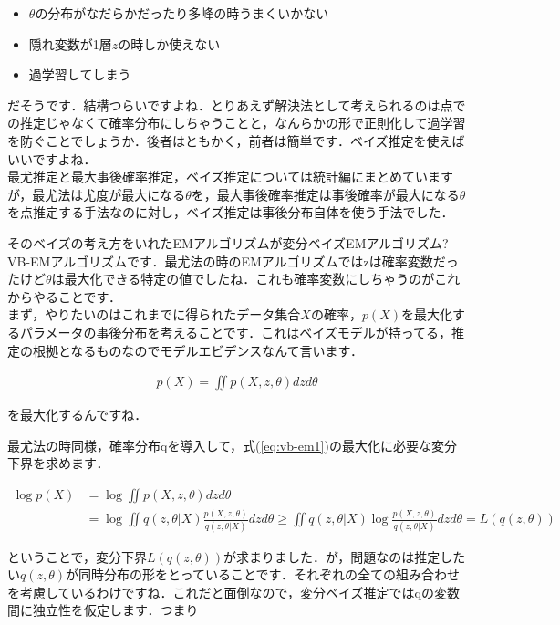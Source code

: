\documentclass[11pt,a4paper,dvipdfmx]{ujreport}
\begin{document}
\begin{itemize}
  \item $\theta$の分布がなだらかだったり多峰の時うまくいかない
  \item 隠れ変数が1層$z$の時しか使えない
  \item 過学習してしまう
\end{itemize}

だそうです．結構つらいですよね．とりあえず解決法として考えられるのは点での推定じゃなくて確率分布にしちゃうことと，なんらかの形で正則化して過学習を防ぐことでしょうか．後者はともかく，前者は簡単です．ベイズ推定を使えばいいですよね．\\

最尤推定と最大事後確率推定，ベイズ推定については統計編にまとめていますが，最尤法は尤度が最大になる$\theta$を，最大事後確率推定は事後確率が最大になる$\theta$を点推定する手法なのに対し，ベイズ推定は事後分布自体を使う手法でした．

そのベイズの考え方をいれたEMアルゴリズムが変分ベイズEMアルゴリズム?VB-EMアルゴリズムです．最尤法の時のEMアルゴリズムではzは確率変数だったけど$\theta$は最大化できる特定の値でしたね．これも確率変数にしちゃうのがこれからやることです．\\

まず，やりたいのはこれまでに得られたデータ集合$X$の確率，$p(X)$を最大化するパラメータの事後分布を考えることです．これはベイズモデルが持ってる，推定の根拠となるものなのでモデルエビデンスなんて言います．

\begin{align}
  \label{eq:vb-em1}
  p(X) = \iint p(X,z,\theta)dzd\theta
\end{align}

を最大化するんですね．

最尤法の時同様，確率分布qを導入して，式(\ref{eq:vb-em1})の最大化に必要な変分下界を求めます．

\begin{align}
  \log p(X) &= \log \iint p(X,z,\theta)dzd\theta\\
  &=\log \iint q(z,\theta|X)\frac{p(X,z,\theta)}{q(z,\theta|X)}dzd\theta \geq \iint q(z,\theta|X) \log \frac{p(X,z,\theta)}{q(z,\theta|X)}dzd\theta = L(q(z,\theta))
\end{align}

ということで，変分下界$L(q(z,\theta))$が求まりました．が，問題なのは推定したい$q(z,\theta)$が同時分布の形をとっていることです．それぞれの全ての組み合わせを考慮しているわけですね．これだと面倒なので，変分ベイズ推定ではqの変数間に独立性を仮定します．つまり
\end{document}
